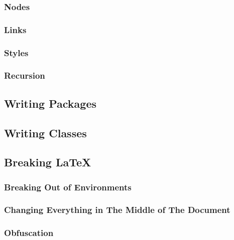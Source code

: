 \subsubsection{Nodes}
\subsubsection{Links}
\subsubsection{Styles}
\subsubsection{Recursion}


\subsection{Writing Packages}


\subsection{Writing Classes}


\subsection{Breaking \LaTeX}
\subsubsection{Breaking Out of Environments}
\subsubsection{Changing Everything in The Middle of The Document}
\subsubsection{Obfuscation}